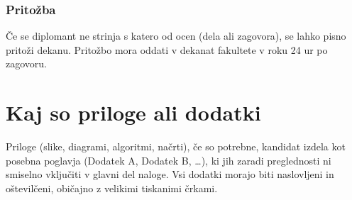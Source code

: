 \documentclass[12pt,a4paper]{book}
\begin{document}
\subsection{Pritožba}
Če se diplomant ne strinja s katero od ocen (dela ali zagovora), se lahko pisno pritoži dekanu. Pritožbo mora oddati v dekanat fakultete v roku
24 ur po zagovoru. 

\newpage


\appendix


\chapter{Kaj so priloge ali dodatki}

Priloge (slike, diagrami, algoritmi, načrti), 
če so potrebne, kandidat izdela kot posebna poglavja (Dodatek A, Dodatek B, \ldots), ki jih zaradi preglednosti ni smiselno vključiti v glavni
del naloge. Vsi dodatki morajo biti naslovljeni in oštevilčeni, običajno z velikimi tiskanimi črkami. 

\newpage

\listoffigures

\newpage

\listoftables




\newpage


\label{stran_literatura}
 
\end{document}
